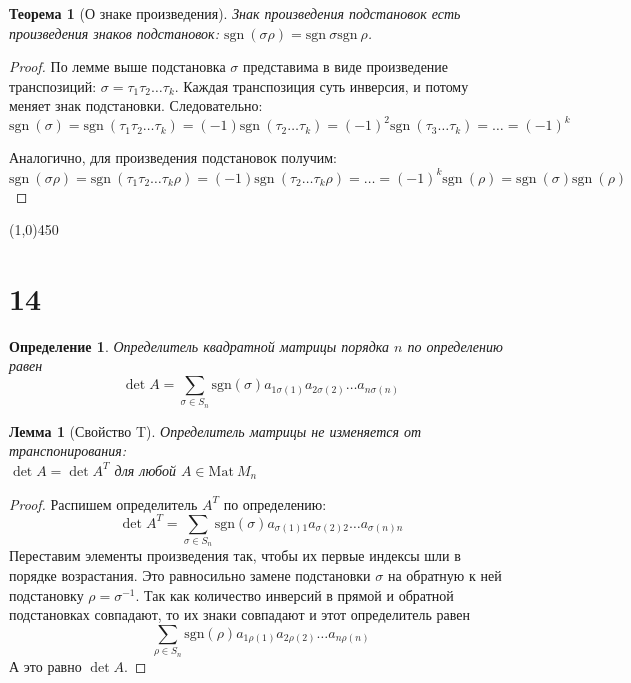 \documentclass[a4paper,12pt]{article}
\newcommand{\Mat}{\mathrm{Mat}}
\newcommand{\sgn}{\mathrm{sgn\:}}
\newtheorem*{definition}{Определение}
\newtheorem*{theorem}{Теорема}
\newtheorem*{lemma}{Лемма}
\begin{document}
	\begin{theorem}[О знаке произведения]
		Знак произведения подстановок есть произведения знаков подстановок: $\sgn (\sigma\rho) = \sgn \sigma \sgn \rho$.
	\end{theorem}
	\begin{proof}
		По лемме выше подстановка $\sigma$ представима в виде произведение транспозиций: $\sigma = \tau_1\tau_2\dots\tau_k$. Каждая транспозиция суть инверсия, и потому меняет знак подстановки. Следовательно:
		$$
		\sgn(\sigma) = \sgn(\tau_1\tau_2\dots\tau_k) = (-1)\sgn(\tau_2\dots\tau_k) = (-1)^2\sgn(\tau_3\dots\tau_k) = \dots = (-1)^k
		$$
		
		Аналогично, для произведения подстановок получим:
		$$
		\sgn(\sigma\rho) = \sgn(\tau_1\tau_2\dots\tau_k\rho) = (-1)\sgn(\tau_2\dots\tau_k\rho) = \dots = (-1)^k \sgn(\rho) = \sgn(\sigma)\sgn(\rho)
		$$
	\end{proof}
	\begin{center}
		\line(1,0){450}
	\end{center}
	
	\section*{14}
	\begin{definition}
		Определитель квадратной матрицы порядка $n$ по определению равен
		\[\det{A} = \sum_{\sigma \in S_n} \text{sgn}(\sigma)a_{1\sigma(1)}a_{2\sigma(2)}\ldots a_{n\sigma(n)}\]
	\end{definition}
	
	\begin{lemma}[Свойство T]
		Определитель матрицы не изменяется от транспонирования:\\ $\det A = \det A^T$ для любой $A \in \Mat\ M_{n}$ 
	\end{lemma}
	\begin{proof}
		Распишем определитель $A^T$ по определению:
		\[\det{A^T} = \sum_{\sigma \in S_n} \text{sgn}(\sigma)a_{\sigma(1)1}a_{\sigma(2)2}\ldots a_{\sigma(n)n}\]
		Переставим элементы произведения так, чтобы их первые индексы шли в порядке возрастания. Это равносильно замене подстановки $\sigma$ на обратную к ней подстановку $\rho = \sigma^{-1}$. Так как количество инверсий в прямой и обратной подстановках совпадают, то их знаки совпадают и этот определитель равен
		\[\sum_{\rho \in S_n} \text{sgn}(\rho)a_{1\rho(1)}a_{2\rho(2)}\ldots a_{n\rho(n)}\]
		А это равно $\det{A}$.
	\end{proof}
	
\end{document}
